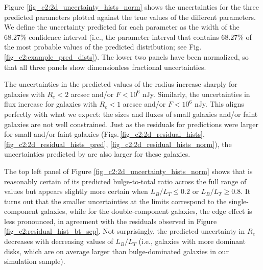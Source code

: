 Figure \ref{fig_c2:2d_uncertainty_hists_norm} shows the uncertainties for the three predicted parameters plotted against the true values of the different parameters. 
We define the uncertainty predicted for each parameter as the width of the $68.27\%$ confidence interval (i.e., the parameter interval that contains $68.27\%$ of the most probable values of the predicted distribution; see Fig.\,\ref{fig_c2:example_pred_dists}). 
The lower two panels have been normalized, so that all three panels show dimensionless fractional uncertainties.

The uncertainties in the predicted values of the radius increase sharply for galaxies with $R_e < 2$ arcsec and/or $F < 10^6$ nJy. Similarly, the uncertainties in flux increase for galaxies with $R_e < 1$ arcsec and/or $F < 10^6$ nJy. 
This aligns perfectly with what we expect: the sizes and fluxes of small galaxies and/or faint galaxies are not well constrained.
Just as the residuals for \gampen{} predictions were larger for small and/or faint galaxies (Figs.\,\ref{fig_c2:2d_residual_hists}, \ref{fig_c2:2d_residual_hists_pred}, \ref{fig_c2:2d_residual_hists_norm}), the uncertainties predicted by \gampen{} are also larger for these galaxies.

The top left panel of Figure \ref{fig_c2:2d_uncertainty_hists_norm} shows that \gampen{} is reasonably certain of its predicted %
bulge-to-total ratio across the full range of values but appears slightly more certain when $L_B/L_T \leq 0.2$ or $L_B/L_T \geq 0.8$. It turns out that the smaller uncertainties at the limits correspond to the single-component galaxies, while for the double-component galaxies, the edge effect is less pronounced, in agreement with the residuals observed in Figure \ref{fig_c2:residual_hist_bt_sep}.
Not surprisingly, the predicted uncertainty in $R_e$ decreases with decreasing values of $L_B/L_T$ (i.e., galaxies with more dominant disks, which are on average larger than bulge-dominated galaxies in our simulation sample). 

